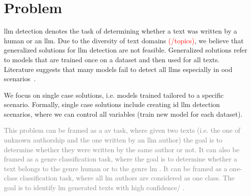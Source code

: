 \section{Problem}
\label{sec:problem}

\ac{llm} detection denotes the task of determining whether a text was written by a human or an \ac{llm}.
Due to the diversity of text domains \textcolor{red}{(/topics)}, we believe that generalized solutions for \ac{llm} detection are not feasible.
Generalized solutions refer to models that are trained once on a dataset and then used for all texts.
Literature suggests that many models fail to detect all \acp{llm} especially in \ac{ood} scenarios~\citep{bhattacharjee_fighting_2024,li_learning_2025}.

We focus on single case solutions, i.e. models trained tailored to a specific scenario.
Formally, single case solutions include creating \ac{id} \ac{llm} detection scenarios, 
where we can control all variables (train new model for each dataset).

\textcolor{gray}{
This problem can be framed as a \ac{av} task, where given two texts 
(i.e. the one of unknown authorship and the one written by an \ac{llm} author) 
the goal is to determine whether they were written by the same author or not.
It can also be framed as a genre classification task, where the goal is to determine whether a text belongs 
to the genre human or to the genre \ac{lm} .
It can be framed as a one-class classification task, where all \ac{lm} authors are considered as one class.
The goal is to identify \ac{lm} generated texts with high confidence/ .
}

